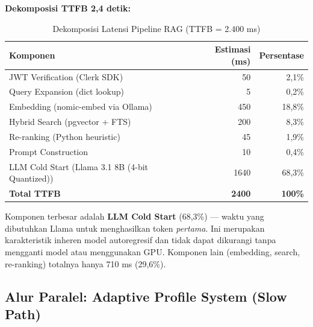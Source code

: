 \textbf{Dekomposisi TTFB 2,4 detik:}
\begin{table}[H]
\centering
\caption{Dekomposisi Latensi Pipeline RAG (TTFB = 2.400 ms)}
\label{tab:latency}
\begin{tabular}{lrr}
\toprule
\textbf{Komponen} & \textbf{Estimasi (ms)} & \textbf{Persentase} \\
\midrule
JWT Verification (Clerk SDK) & 50 & 2,1\% \\
Query Expansion (dict lookup) & 5 & 0,2\% \\
Embedding (nomic-embed via Ollama) & 450 & 18,8\% \\
Hybrid Search (pgvector + FTS) & 200 & 8,3\% \\
Re-ranking (Python heuristic) & 45 & 1,9\% \\
Prompt Construction & 10 & 0,4\% \\
LLM Cold Start (Llama 3.1 8B (4-bit Quantized)) & 1640 & 68,3\% \\
\midrule
\textbf{Total TTFB} & \textbf{2400} & \textbf{100\%} \\
\bottomrule
\end{tabular}
\end{table}

Komponen terbesar adalah \textbf{LLM Cold Start} (68,3\%) --- waktu yang dibutuhkan
Llama untuk menghasilkan token \textit{pertama}. Ini merupakan karakteristik inheren
model autoregresif dan tidak dapat dikurangi tanpa mengganti model atau menggunakan GPU.
Komponen lain (embedding, search, re-ranking) totalnya hanya 710 ms (29,6\%).

\subsection{Alur Paralel: Adaptive Profile System (Slow Path)}

